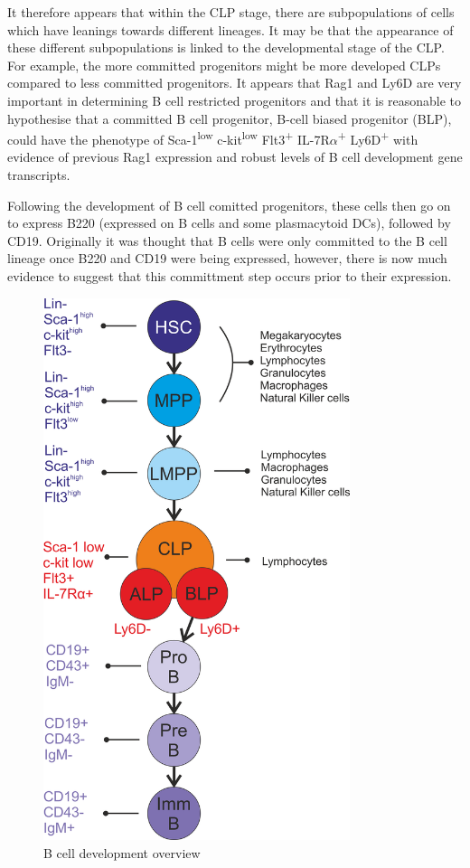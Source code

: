It therefore appears that within the CLP stage, there are subpopulations of cells which have leanings towards different lineages.
It may be that the appearance of these different subpopulations is linked to the developmental stage of the CLP.
For example, the more committed progenitors might be more developed CLPs compared to less committed progenitors.
It appears that Rag1 and Ly6D are very important in determining B cell restricted progenitors and that it is reasonable to hypothesise that a committed B cell progenitor, B-cell biased progenitor (BLP), could have the phenotype of Sca-1\textsuperscript{low} c-kit\textsuperscript{low} Flt3\textsuperscript{+} IL-7R$\alpha$\textsuperscript{+} Ly6D\textsuperscript{+} with evidence of previous Rag1 expression and robust levels of B cell development gene transcripts.

Following the development of B cell comitted progenitors, these cells then go on to express B220 (expressed on B cells and some plasmacytoid DCs), followed by CD19.
Originally it was thought that B cells were only committed to the B cell lineage once B220 and CD19 were being expressed, however, there is now much evidence to suggest that this committment step occurs prior to their expression.

\begin{figure}
\centering
\includegraphics[width=0.8\textwidth]{Figures/Bcelldevdiagram.png}
\caption{B cell development overview}
\end{figure}


